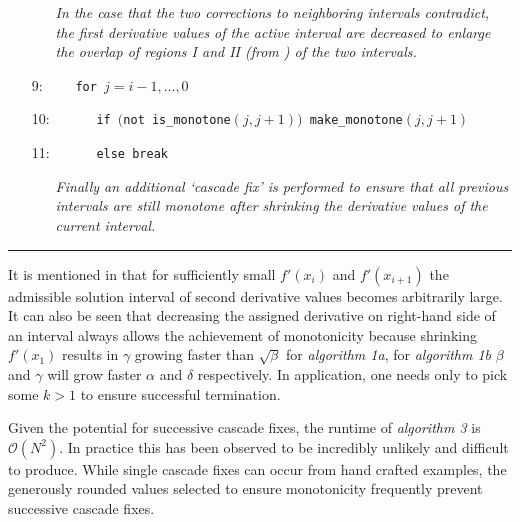 \documentclass{scspaperproc}
\theoremstyle{scsthe}
\begin{document}
\begin{itemize}
  \begin{itemize}
    \item[] \textit{In the case that the two corrections to neighboring intervals contradict, the first derivative values of the active interval are decreased to enlarge the overlap of regions I and II (from \cite{ulrich1994positivity}) of the two intervals.}
  \end{itemize}

\item[9:] $\quad\quad$\texttt{for $j=i-1,\ldots,0$}
\item[10:] $\quad\quad\quad$\texttt{if $\big($not is\_monotone$(j,j+1)\big)$  make\_monotone$(j,j+1)$}
\item[11:] $\quad\quad\quad$\texttt{else break}

  \begin{itemize}
    \item[] \textit{Finally an additional `cascade fix' is performed to ensure that all previous intervals are still monotone after shrinking the derivative values of the current interval.}
  \end{itemize}

\end{itemize}
\hrule
\vspace{10pt}

It is mentioned in \cite{ulrich1994positivity} that for sufficiently small $f'(x_i)$ and $f'(x_{i+1})$ the admissible solution interval of second derivative values becomes arbitrarily large. It can also be seen that decreasing the assigned derivative on right-hand side of an interval always allows the achievement of monotonicity because shrinking $f'(x_1)$ results in $\gamma$ growing faster than $\sqrt{\beta}$ for \textit{algorithm 1a}, for \textit{algorithm 1b} $\beta$ and $\gamma$ will grow faster $\alpha$ and $\delta$ respectively. In application, one needs only to pick some $k > 1$ to ensure successful termination.

Given the potential for successive cascade fixes, the runtime of \textit{algorithm 3} is $\mathcal{O}(N^2)$. In practice this has been observed to be incredibly unlikely and difficult to produce. While single cascade fixes can occur from hand crafted examples, the generously rounded values selected to ensure monotonicity frequently prevent successive cascade fixes.


\end{document}
